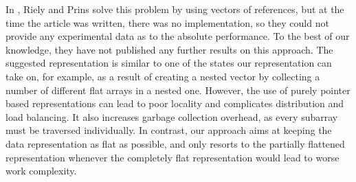 In \cite{Riely:flattening-improvement}, Riely and Prins solve this problem by using vectors of references, but at the time the article was written, there was no implementation, so they could not provide any experimental data as to the absolute performance. To the best of our knowledge, they have not published any further results on this approach. The suggested representation is similar to one of the states our representation can take on, for example, as a result of creating a nested vector by
collecting a number of different flat arrays in a nested one. However, the use of purely pointer based representations can lead to poor locality and complicates distribution and load balancing. It also increases garbage collection overhead, as every subarray must be traversed individually. In contrast, our approach aims at keeping the data representation as flat as possible, and only resorts to the partially flattened representation whenever the completely flat representation would lead to 
worse work complexity. 

\eject
